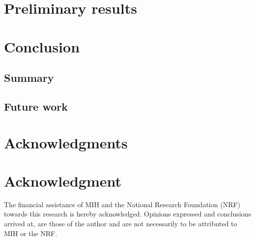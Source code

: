 \documentclass[10pt,a4paper,journal,cspaper,compsoc]{IEEEtran}
\begin{document}
\section{Preliminary results}
\label{results}

\section{Conclusion}
\label{conclusion}

\subsection{Summary}

\subsection{Future work}


\ifCLASSOPTIONcompsoc
  \section*{Acknowledgments}
\else
  \section*{Acknowledgment}
\fi

The financial assistance of MIH and the National Research Foundation (NRF) towards this research is hereby acknowledged. Opinions expressed and
conclusions arrived at, are those of the author and are not necessarily to be attributed to MIH or the NRF.




\end{document}
